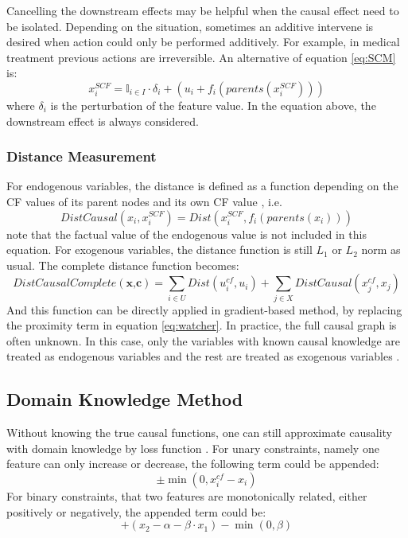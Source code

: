 Cancelling the downstream effects may be helpful when the causal effect need to be isolated. Depending on the situation, sometimes an additive intervene is desired when action could only be performed additively. For example, in medical treatment previous actions are irreversible. An alternative of equation \ref{eq:SCM} is:
\begin{equation}\label{eq:SCMsoft}
  x_i^{SCF}=\mathbb{I}_{i\in I}\cdot \delta_i+(u_i+f_i(parents(x_i^{SCF})))
\end{equation}
where $\delta_i$ is the perturbation of the feature value. In the equation above, the downstream effect is always considered.

\subsubsection{Distance Measurement} For endogenous variables, the distance is defined as a function depending on the CF values of its parent nodes and its own CF value \cite{preservingCausal}, i.e.
\begin{equation}\label{eq:CausalDist}
  DistCausal(x_i,x_i^{SCF})=Dist(x_i^{SCF},f_i(parents(x_i)))
\end{equation}
note that the factual value of the endogenous value is not included in this equation. For exogenous variables, the distance function is still $L_1$ or $L_2$ norm as usual. The complete distance function becomes:
\begin{equation}\label{eq:CausalDistComplete}
  DistCausalComplete(\textbf{x,c})=\sum_{i\in U}Dist(u_i^{cf},u_i)+\sum_{j\in X}DistCausal(x_j^{cf},x_j)
\end{equation}
And this function can be directly applied in gradient-based method, by replacing the proximity term in equation \ref{eq:watcher}. In practice, the full causal graph is often unknown. In this case, only the variables with known causal knowledge are treated as endogenous variables and the rest are treated as exogenous variables \cite{preservingCausal}.

\subsection{Domain Knowledge Method}
Without knowing the true causal functions, one can still approximate causality with domain knowledge by loss function \cite{preservingCausal}. For unary constraints, namely one feature can only increase or decrease, the following term could be appended:
\begin{equation}\label{eq:approxUnary}
  \pm \min(0,x_i^{cf}-x_i)
\end{equation}
For binary constraints, that two features are monotonically related, either positively or negatively, the appended term could be:
\begin{equation}\label{eq:approxBi}
  +(x_2-\alpha-\beta\cdot x_1)-\min(0,\beta)
\end{equation}
